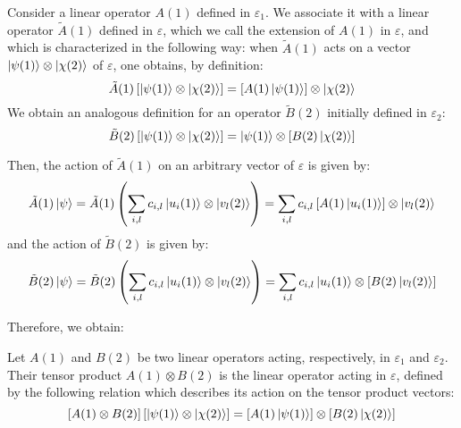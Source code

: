 \begin{definition} \label{tensor_product_operator}
    Consider a linear operator $A(1)$ defined in $\varepsilon_1$. We associate it with a linear operator $\tilde{A}(1)$ defined in $\varepsilon$, which we call the extension of $A(1)$ in $\varepsilon$, and which is characterized in the following way: when $\tilde{A}(1)$ acts on a vector $\ket{\psi(1)}\otimes\ket{\chi(2)}$ of $\varepsilon$, one obtains, by definition:
    \begin{equation}
        \tilde{A}(1)\left[\ket{\psi(1)}\otimes\ket{\chi(2)}\right] = \left[A(1)\ket{\psi(1)}\right]\otimes\ket{\chi(2)}
    \end{equation}
    We obtain an analogous definition for an operator $\tilde{B}(2)$ initially defined in $\varepsilon_2$:
    \begin{equation}
        \tilde{B}(2)\left[\ket{\psi(1)}\otimes\ket{\chi(2)}\right] = \ket{\psi(1)}\otimes\left[B(2)\ket{\chi(2)}\right]
    \end{equation}
\end{definition}
Then, the action of $\tilde{A}(1)$ on an arbitrary vector of $\varepsilon$ is given by:
\begin{equation}
    \tilde{A}(1)\ket{\psi} = \tilde{A}(1)\left(\sum_{i,l} c_{i,l}\ket{u_i(1)}\otimes\ket{v_l(2)}\right) = \sum_{i,l} c_{i,l}\left[A(1)\ket{u_i(1)}\right]\otimes\ket{v_l(2)}
\end{equation}
and the action of $\tilde{B}(2)$ is given by:
\begin{equation}
    \tilde{B}(2)\ket{\psi} = \tilde{B}(2)\left(\sum_{i,l} c_{i,l}\ket{u_i(1)}\otimes\ket{v_l(2)}\right) = \sum_{i,l} c_{i,l}\ket{u_i(1)}\otimes\left[B(2)\ket{v_l(2)}\right]
\end{equation}

Therefore, we obtain:
\begin{definition} \label{tensor_product_operator_2}
    Let $A(1)$ and $B(2)$ be two linear operators acting, respectively, in $\varepsilon_1$ and $\varepsilon_2$. Their tensor product $A(1)\otimes B(2)$ is the linear operator acting in $\varepsilon$, defined by the following relation which describes its action on the tensor product vectors:
    \begin{equation}
        \left[A(1)\otimes B(2)\right]\left[\ket{\psi(1)}\otimes\ket{\chi(2)}\right] = \left[A(1)\ket{\psi(1)}\right]\otimes\left[B(2)\ket{\chi(2)}\right]
    \end{equation}
\end{definition}

